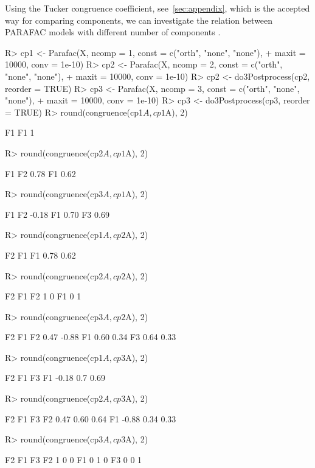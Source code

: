 \documentclass[article,shortnames, nojss]{jss}
\begin{document}
Using the Tucker congruence coefficient, see~\ref{sec:appendix}, which
is the accepted way for comparing components,
we can investigate the relation between PARAFAC
models with different number of components
\citep[see][Table 2]{kroonenberg:2009}.
\begin{Schunk}
\begin{Sinput}
R> cp1 <- Parafac(X, ncomp = 1, const = c("orth", "none", "none"),
+      maxit = 10000, conv = 1e-10)
R> cp2 <- Parafac(X, ncomp = 2, const = c("orth", "none", "none"),
+      maxit = 10000, conv = 1e-10)
R> cp2 <- do3Postprocess(cp2, reorder = TRUE)
R> cp3 <- Parafac(X, ncomp = 3, const = c("orth", "none", "none"),
+      maxit = 10000, conv = 1e-10)
R> cp3 <- do3Postprocess(cp3, reorder = TRUE)
R> round(congruence(cp1$A, cp1$A), 2)
\end{Sinput}
\begin{Soutput}
   F1
F1  1
\end{Soutput}
\begin{Sinput}
R> round(congruence(cp2$A, cp1$A), 2)
\end{Sinput}
\begin{Soutput}
     F1
F2 0.78
F1 0.62
\end{Soutput}
\begin{Sinput}
R> round(congruence(cp3$A, cp1$A), 2)
\end{Sinput}
\begin{Soutput}
      F1
F2 -0.18
F1  0.70
F3  0.69
\end{Soutput}
\begin{Sinput}
R> round(congruence(cp1$A, cp2$A), 2)
\end{Sinput}
\begin{Soutput}
     F2   F1
F1 0.78 0.62
\end{Soutput}
\begin{Sinput}
R> round(congruence(cp2$A, cp2$A), 2)
\end{Sinput}
\begin{Soutput}
   F2 F1
F2  1  0
F1  0  1
\end{Soutput}
\begin{Sinput}
R> round(congruence(cp3$A, cp2$A), 2)
\end{Sinput}
\begin{Soutput}
     F2    F1
F2 0.47 -0.88
F1 0.60  0.34
F3 0.64  0.33
\end{Soutput}
\begin{Sinput}
R> round(congruence(cp1$A, cp3$A), 2)
\end{Sinput}
\begin{Soutput}
      F2  F1   F3
F1 -0.18 0.7 0.69
\end{Soutput}
\begin{Sinput}
R> round(congruence(cp2$A, cp3$A), 2)
\end{Sinput}
\begin{Soutput}
      F2   F1   F3
F2  0.47 0.60 0.64
F1 -0.88 0.34 0.33
\end{Soutput}
\begin{Sinput}
R> round(congruence(cp3$A, cp3$A), 2)
\end{Sinput}
\begin{Soutput}
   F2 F1 F3
F2  1  0  0
F1  0  1  0
F3  0  0  1
\end{Soutput}
\end{Schunk}
\end{document}
